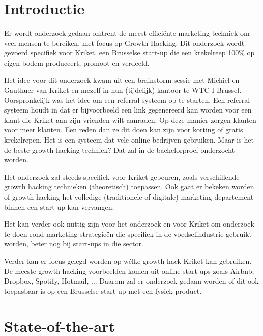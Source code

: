 
\section{Introductie} %
\label{sec:introductie}

Er wordt onderzoek gedaan omtrent de meest efficiënte marketing techniek om veel mensen te bereiken, met focus op Growth Hacking. Dit onderzoek wordt gevoerd specifiek voor Kriket, een Brusselse start-up die een krekelreep 100\% op eigen bodem produceert, promoot en verdeeld.

Het idee voor dit onderzoek kwam uit een brainstorm-sessie met Michiel en Gauthuer van Kriket en mezelf in hun (tijdelijk) kantoor te WTC I Brussel. Oorspronkelijk was het idee om een referral-systeem op te starten. 
Een referral-systeem houdt in dat er bijvoorbeeld een link gegenereerd kan worden voor een klant die Kriket aan zijn vrienden wilt aanraden. Op deze manier zorgen klanten voor meer klanten. Een reden dan ze dit doen kan zijn voor korting of gratis krekelrepen. Het is een systeem dat vele online bedrijven gebruiken. Maar is het de beste growth hacking techniek? Dat zal in de bachelorproef onderzocht worden.

Het onderzoek zal steeds specifiek voor Kriket gebeuren, zoals verschillende growth hacking technieken (theoretisch) toepassen. Ook gaat er bekeken worden of growth hacking het volledige (traditionele of digitale) marketing departement binnen een start-up kan vervangen.

Het kan verder ook nuttig zijn voor het onderzoek en voor Kriket om onderzoek te doen rond marketing strategieën die specifiek in de voedselindustrie gebruikt worden, beter nog bij start-ups in die sector.

Verder kan er focus gelegd worden op wélke growth hack Kriket kan gebruiken. De meeste growth hacking voorbeelden komen uit online start-ups zoals Airbnb, Dropbox, Spotify, Hotmail, ... Daarom zal er onderzoek gedaan worden of dit ook toepasbaar is op een Brusselse start-up met een fysiek product.


\section{State-of-the-art}
\label{sec:state-of-the-art}

